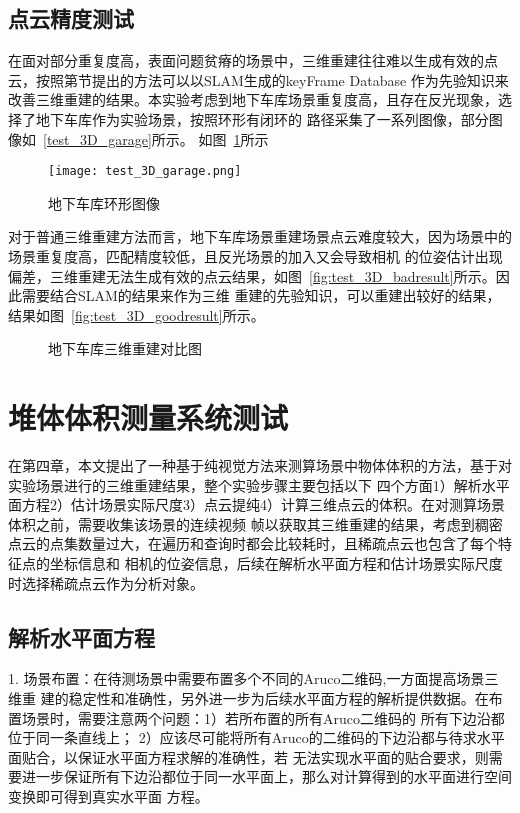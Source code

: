 \subsection{点云精度测试}
在面对部分重复度高，表面问题贫瘠的场景中，三维重建往往难以生成有效的点云，按照第节提出的方法可以以SLAM生成的keyFrame Database
作为先验知识来改善三维重建的结果。本实验考虑到地下车库场景重复度高，且存在反光现象，选择了地下车库作为实验场景，按照环形有闭环的
路径采集了一系列图像，部分图像如~\ref{test_3D_garage}所示。
如图~\ref{fig:test_3D_garage}所示
\begin{figure}[H] %
  \centering
  \texttt{[image: test\_3D\_garage.png]}
  \caption{地下车库环形图像}
  \label{fig:test_3D_garage}
  \end{figure}
对于普通三维重建方法而言，地下车库场景重建场景点云难度较大，因为场景中的场景重复度高，匹配精度较低，且反光场景的加入又会导致相机
的位姿估计出现偏差，三维重建无法生成有效的点云结果，如图~\ref{fig:test_3D_badresult}所示。因此需要结合SLAM的结果来作为三维
重建的先验知识，可以重建出较好的结果，结果如图~\ref{fig:test_3D_goodresult}所示。
  \begin{figure}[h]
  \centering
  \vskip0.5cm
  \caption{地下车库三维重建对比图}\label{fig:test_3D}
\end{figure}

\section{堆体体积测量系统测试}
\label{sec:5.4}
在第四章，本文提出了一种基于纯视觉方法来测算场景中物体体积的方法，基于对实验场景进行的三维重建结果，整个实验步骤主要包括以下
四个方面1）解析水平面方程2）估计场景实际尺度3）点云提纯4）计算三维点云的体积。在对测算场景体积之前，需要收集该场景的连续视频
帧以获取其三维重建的结果，考虑到稠密点云的点集数量过大，在遍历和查询时都会比较耗时，且稀疏点云也包含了每个特征点的坐标信息和
相机的位姿信息，后续在解析水平面方程和估计场景实际尺度时选择稀疏点云作为分析对象。
\subsection{解析水平面方程}
\label{sec:5.4.1}
1.	场景布置：在待测场景中需要布置多个不同的Aruco二维码,一方面提高场景三维重
建的稳定性和准确性，另外进一步为后续水平面方程的解析提供数据。在布置场景时，需要注意两个问题：1）若所布置的所有Aruco二维码的
所有下边沿都位于同一条直线上； 2）应该尽可能将所有Aruco的二维码的下边沿都与待求水平面贴合，以保证水平面方程求解的准确性，若
无法实现水平面的贴合要求，则需要进一步保证所有下边沿都位于同一水平面上，那么对计算得到的水平面进行空间变换即可得到真实水平面
方程。

